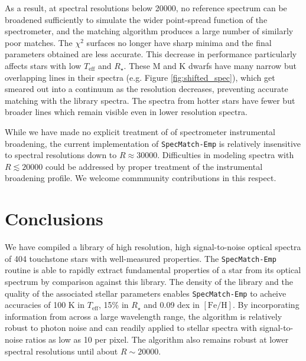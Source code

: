 \documentclass[preprint2]{aastex6}
\newcommand{\SpecMatch}{\texttt{SpecMatch-Emp}\xspace}
\newcommand{\chisq}{\ensuremath{\chi^2}\xspace}
\newcommand{\Rstar}{\ensuremath{R_{\star}}\xspace}
\newcommand{\fe}{\ensuremath{\mathrm{[Fe/H]}}\xspace}
\newcommand{\teff}{\ensuremath{T_{\mathrm{eff}}}\xspace}
\newcommand{\libnum}{404\xspace}
\newcommand{\sigteff}{100 K\xspace}
\newcommand{\sigRstar}{15\%\xspace}
\newcommand{\sigfe}{0.09 dex\xspace}
\begin{document}
As a result, at spectral resolutions below 20000, no reference spectrum can be broadened sufficiently to simulate the wider point-spread function of the spectrometer, and the matching algorithm produces a large number of similarly poor matches. The \chisq surfaces no longer have sharp minima and the final parameters obtained are less accurate. This decrease in performance particularly affects stars with low \teff and \Rstar. These M and K dwarfs have many narrow but overlapping lines in their spectra (e.g. Figure \ref{fig:shifted_spec}), which get smeared out into a continuum as the resolution decreases, preventing accurate matching with the library spectra. The spectra from hotter stars have fewer but broader lines which remain visible even in lower resolution spectra.

While we have made no explicit treatment of of spectrometer instrumental broadening, the current implementation of \SpecMatch is relatively insensitive to spectral resolutions down to $R\approx30000$. Difficulties in modeling spectra with $R\lesssim20000$ could be addressed by proper treatment of the instrumental broadening profile. We welcome commmunity contributions in this respect.

\begin{figure*}[t]
\caption{Absolute difference between the parameters derived from the spectra with degraded spectral resolution and those derived from the original high-resolution spectra, analogous to figure \ref{fig:noise_study}. \SpecMatch remains accurate down to $R\approx30000$, beyond which the performance degrades rapidly (see \autoref{ssec:resolution}).\label{fig:res_study}} 
\end{figure*}


\section{Conclusions} 
\label{sec:conclusion}
We have compiled a library of high resolution, high signal-to-noise optical spectra of \libnum touchstone stars with well-measured properties. The \SpecMatch routine is able to rapidly extract fundamental properties of a star from its optical spectrum by comparison against this library. The density of the library and the quality of the associated stellar parameters enables \SpecMatch to acheive accuracies of \sigteff in \teff, \sigRstar in \Rstar and \sigfe in \fe. By incorporating information from across a large wavelength range, the algorithm is relatively robust to photon noise and can readily applied to stellar spectra with signal-to-noise ratios as low as 10 per pixel. The algorithm also remains robust at lower spectral resolutions until about $R\sim20000$.
\end{document}
